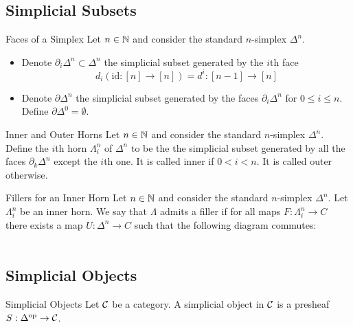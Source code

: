 \documentclass[a4paper]{article}
\begin{document}
\subsection{Simplicial Subsets}
\begin{defn}{Faces of a Simplex}{} Let $n\in\mathbb{N}$ and consider the standard $n$-simplex $\Delta^n$. 
\begin{itemize}
\item Denote $\partial_i\Delta^n\subset\Delta^n$ the simplicial subset generated by the $i$th face $$d_i(\text{id}:[n]\to[n])=d^i:[n-1]\to[n]$$
\item Denote $\partial\Delta^n$ the simplicial subset generated by the faces $\partial_i\Delta^n$ for $0\leq i\leq n$. Define $\partial\Delta^0=\emptyset$. 
\end{itemize}
\end{defn}

\begin{defn}{Inner and Outer Horns}{} Let $n\in\mathbb{N}$ and consider the standard $n$-simplex $\Delta^n$. Define the $i$th horn $\Lambda_i^n$ of $\Delta^n$ to be the the simplicial subset generated by all the faces $\partial_k\Delta^n$ except the $i$th one. It is called inner if $0<i<n$. It is called outer otherwise. 
\end{defn}

\begin{defn}{Fillers for an Inner Horn}{} Let $n\in\mathbb{N}$ and consider the standard $n$-simplex $\Delta^n$. Let $\Lambda_i^n$ be an inner horn. We say that $\Lambda$ admits a filler if for all maps $F:\Lambda_i^n\to C$ there exists a map $U:\Delta^n\to C$ such that the following diagram commutes: \\~\\
\end{defn}

\subsection{Simplicial Objects}
\begin{defn}{Simplicial Objects}{} Let $\mathcal{C}$ be a category. A simplicial object in $\mathcal{C}$ is a presheaf $S:\Delta^\text{op}\to\mathcal{C}$. 
\end{defn}
\end{document}
